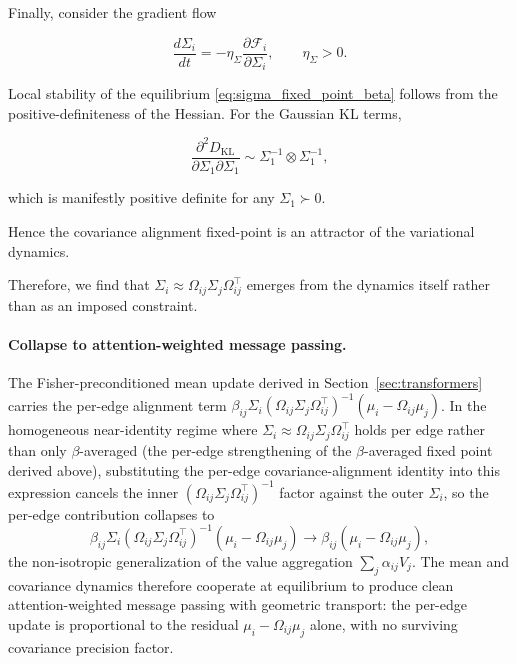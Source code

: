 \documentclass[11pt]{article}
\begin{document}
Finally, consider the gradient flow

\begin{equation}
\frac{d\Sigma_i}{dt}
=-\eta_\Sigma
\frac{\partial \mathcal{F}_i}{\partial \Sigma_i},
\qquad\eta_\Sigma > 0.
\end{equation}

Local stability of the equilibrium \eqref{eq:sigma_fixed_point_beta} follows from the positive-definiteness of the Hessian. For the Gaussian KL terms,

\begin{equation}
\frac{\partial^2 D_{\mathrm{KL}}}{\partial \Sigma_1  \partial \Sigma_1}
\sim
\Sigma_1^{-1} \otimes \Sigma_1^{-1},
\end{equation}

which is manifestly positive definite for any $\Sigma_1 \succ 0$.

Hence the covariance alignment fixed-point is an attractor of the variational dynamics.

Therefore, we find that $\Sigma_i \approx\Omega_{ij}\Sigma_j\Omega_{ij}^\top$ emerges from the dynamics itself rather than as an imposed constraint.

\paragraph{Collapse to attention-weighted message passing.}
The Fisher-preconditioned mean update derived in Section~\ref{sec:transformers} carries the per-edge alignment term $\beta_{ij} \Sigma_i (\Omega_{ij}\Sigma_j\Omega_{ij}^\top)^{-1}(\mu_i - \Omega_{ij}\mu_j)$. In the homogeneous near-identity regime where $\Sigma_i \approx \Omega_{ij}\Sigma_j\Omega_{ij}^\top$ holds per edge rather than only $\beta$-averaged (the per-edge strengthening of the $\beta$-averaged fixed point derived above), substituting the per-edge covariance-alignment identity into this expression cancels the inner $(\Omega_{ij}\Sigma_j\Omega_{ij}^\top)^{-1}$ factor against the outer $\Sigma_i$, so the per-edge contribution collapses to
\begin{equation}
\beta_{ij} \Sigma_i (\Omega_{ij}\Sigma_j\Omega_{ij}^\top)^{-1}(\mu_i - \Omega_{ij}\mu_j) \longrightarrow \beta_{ij}(\mu_i - \Omega_{ij}\mu_j),
\end{equation}
the non-isotropic generalization of the value aggregation $\sum_j \alpha_{ij} V_j$. The mean and covariance dynamics therefore cooperate at equilibrium to produce clean attention-weighted message passing with geometric transport: the per-edge update is proportional to the residual $\mu_i - \Omega_{ij}\mu_j$ alone, with no surviving covariance precision factor.
\end{document}
